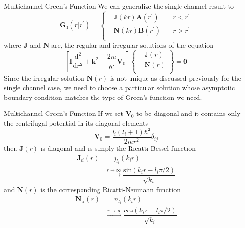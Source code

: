 \documentclass{beamer}
\begin{document}
	\begin{frame}{Multichannel Green's Function}
		We can generalize the single-channel result to
		\begin{equation}
			\mathbf{G}_0(r|r^\prime)=
			\left\{
			\begin{aligned}
				&\mathbf{J}(kr)\mathbf{A}(r^\prime)\quad&r<r^\prime\\
				&\mathbf{N}(kr)\mathbf{B}(r^\prime)\quad&r>r^\prime\\
			\end{aligned}
			\right
			.
		\end{equation}
		where $\mathbf{J}$ and $\mathbf{N}$ are, the regular and irregular solutions of the equation
		\begin{equation}
			\left[ \mathbf{I}\dfrac{\mathrm{d}^2}{\mathrm{d}r^2}+\mathbf{k}^2-\dfrac{2m}{\hbar^2}\mathbf{V}_0\right]
			\left\{
			\begin{aligned}
				&\mathbf{J}(r)\\
				&\mathbf{N}(r)\\
			\end{aligned}
			\right
			\}=\mathbf{0}
		\end{equation}
		Since the irregular solution $\mathbf{N}(r)$ is not unique as discussed previously for the single channel case, we need to choose a particular solution whose asymptotic boundary condition matches the type of Green's function we need.
	\end{frame}
	\begin{frame}{Multichannel Green's Function}
		If we set $\mathbf{V}_0$ to be diagonal and it contains only the centrifugal potential in its diagonal elements
		\begin{equation}
			\mathbf{V}_0=\dfrac{l_i(l_i+1)\hbar^2}{2mr^2}\delta_{ij}
		\end{equation}
		then $\mathbf{J}(r)$ is diagonal and is simply the Ricatti-Bessel function
		\begin{align}
			\mathbf{J}_{ii}(r)&=j_{l_i}(k_ir)\nonumber\\
			&\stackrel{r\rightarrow\infty}{\longrightarrow}\dfrac{\mathrm{sin}(k_ir-l_i\pi/2)}{\sqrt{k_i}}
		\end{align}
		and $\mathbf{N}(r)$ is the corresponding Ricatti-Neumann function
		\begin{align}
			\mathbf{N}_{ii}(r)&=n_{l_i}(k_ir)\nonumber\\
			&\stackrel{r\rightarrow\infty}{\longrightarrow}\dfrac{\mathrm{cos}(k_ir-l_i\pi/2)}{\sqrt{k_i}}
		\end{align}
	\end{frame}
\end{document}
